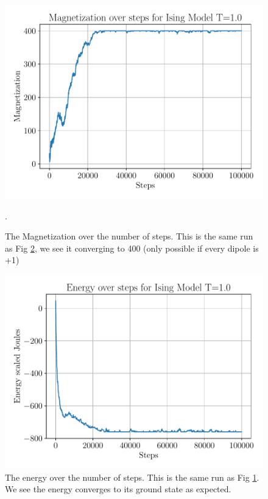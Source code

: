\documentclass{article}
\begin{document}
\begin{figure}[H]
    \centerline{\includegraphics[scale=0.75]{images/Q2_magnetizationT_1.0.pdf}}
    \caption{The Magnetization over the number of steps. This is the same run as Fig \ref{fig:q2c_energy}, we see it converging to 400 (only possible if every dipole is +1)}.
    \label{fig:q2c_magnet}
\end{figure}

\begin{figure}[H]
    \centerline{\includegraphics[scale=0.75]{images/Q2_energy_T_1.0.pdf}}
    \caption{The energy over the number of steps. This is the same run as Fig \ref{fig:q2c_magnet}. We see the energy converges to its ground state as expected.}
    \label{fig:q2c_energy}
\end{figure}
\end{document}
